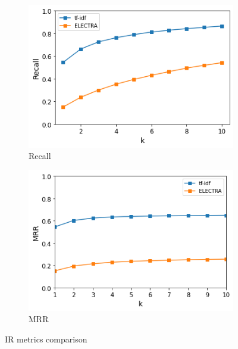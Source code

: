 \documentclass{article}
\begin{document}
\begin{figure}
     \centering
     \begin{subfigure}[b]{0.49\textwidth}
         \centering
         \includegraphics[width=\textwidth]{recall.png}
         \caption{Recall}
         \label{fig:metrics - recall}
     \end{subfigure}
     \hfill
     \begin{subfigure}[b]{0.49\textwidth}
         \centering
         \includegraphics[width=\textwidth]{mrr.png}
         \caption{MRR}
         \label{fig:metrics - mrr}
     \end{subfigure}
     \hfill
        \caption{IR metrics comparison}
        \label{IR metrics}
\end{figure}

\end{document}
